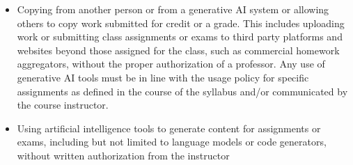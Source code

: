 \begin{itemize}
    \item Copying from another person or from a generative AI system or allowing others to copy work submitted for credit or a grade. This includes uploading work or submitting class assignments or exams to third party platforms and websites beyond those assigned for the class, such as commercial homework aggregators, without the proper authorization of a professor. Any use of generative AI tools must be in line with the usage policy for specific assignments as defined in the course of the syllabus and/or communicated by the course instructor.
    \item Using artificial intelligence tools to generate content for assignments or exams, including but not limited to language models or code generators, without written authorization from the instructor
\end{itemize}